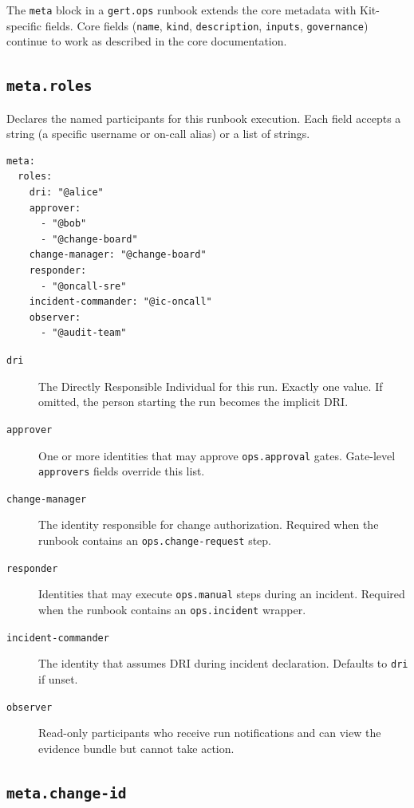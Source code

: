 The \texttt{meta} block in a \texttt{gert.ops} runbook extends the core metadata with
Kit-specific fields. Core fields (\texttt{name}, \texttt{kind}, \texttt{description},
\texttt{inputs}, \texttt{governance}) continue to work as described in the core documentation.

\subsection{\texttt{meta.roles}}

Declares the named participants for this runbook execution. Each field accepts a string (a
specific username or on-call alias) or a list of strings.

\begin{verbatim}
meta:
  roles:
    dri: "@alice"
    approver:
      - "@bob"
      - "@change-board"
    change-manager: "@change-board"
    responder:
      - "@oncall-sre"
    incident-commander: "@ic-oncall"
    observer:
      - "@audit-team"
\end{verbatim}

\begin{description}
  \item[\texttt{dri}] The Directly Responsible Individual for this run. Exactly one value.
    If omitted, the person starting the run becomes the implicit DRI.
  \item[\texttt{approver}] One or more identities that may approve \texttt{ops.approval}
    gates. Gate-level \texttt{approvers} fields override this list.
  \item[\texttt{change-manager}] The identity responsible for change authorization.
    Required when the runbook contains an \texttt{ops.change-request} step.
  \item[\texttt{responder}] Identities that may execute \texttt{ops.manual} steps during
    an incident. Required when the runbook contains an \texttt{ops.incident} wrapper.
  \item[\texttt{incident-commander}] The identity that assumes DRI during incident
    declaration. Defaults to \texttt{dri} if unset.
  \item[\texttt{observer}] Read-only participants who receive run notifications and can view
    the evidence bundle but cannot take action.
\end{description}

\subsection{\texttt{meta.change-id}}

